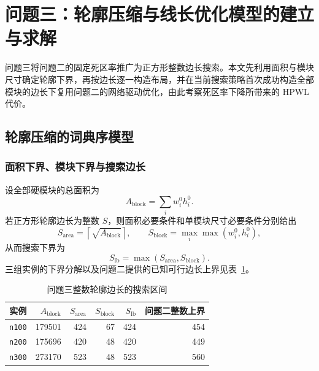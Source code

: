 \section{问题三：轮廓压缩与线长优化模型的建立与求解}

问题三将问题二的固定死区率推广为正方形整数边长搜索。本文先利用面积与模块尺寸确定轮廓下界，再按边长逐一构造布局，并在当前搜索策略首次成功构造全部模块的边长下复用问题二的网络驱动优化，由此考察死区率下降所带来的 HPWL 代价。

\subsection{轮廓压缩的词典序模型}

\subsubsection{面积下界、模块下界与搜索边长}

设全部硬模块的总面积为
\begin{equation}
  A_{\mathrm{block}}=\sum_i w_i^0h_i^0.
  \label{eq:q3_block_area}
\end{equation}
若正方形轮廓边长为整数 $S$，则面积必要条件和单模块尺寸必要条件分别给出
\begin{equation}
  S_{\mathrm{area}}=\left\lceil\sqrt{A_{\mathrm{block}}}\right\rceil,
  \qquad
  S_{\mathrm{block}}=\max_i\max(w_i^0,h_i^0),
  \label{eq:q3_lower_bounds}
\end{equation}
从而搜索下界为
\begin{equation}
  S_{\mathrm{lb}}=\max\left(S_{\mathrm{area}},S_{\mathrm{block}}\right).
  \label{eq:q3_search_lb}
\end{equation}
三组实例的下界分解以及问题二提供的已知可行边长上界见表~\ref{tab:q3_search_bounds}。

\begin{table}[H]
  \centering
  \caption{问题三整数轮廓边长的搜索区间}
  \label{tab:q3_search_bounds}
  \small
  \renewcommand{\arraystretch}{1.15}
  \begin{tabular}{c r r r r r}
    \toprule
    实例 & $A_{\mathrm{block}}$ & $S_{\mathrm{area}}$ & $S_{\mathrm{block}}$ & $S_{\mathrm{lb}}$ & 问题二整数上界 \\
    \midrule
    \texttt{n100} & 179501 & 424 & 67 & 424 & 454 \\
    \texttt{n200} & 175696 & 420 & 48 & 420 & 449 \\
    \texttt{n300} & 273170 & 523 & 48 & 523 & 560 \\
    \bottomrule
  \end{tabular}
\end{table}

